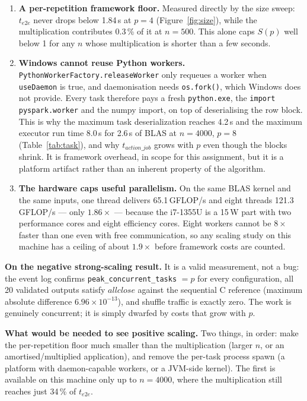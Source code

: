 \documentclass[11pt,a4paper]{article}
\begin{document}
\begin{enumerate}
  \item \textbf{A per-repetition framework floor.} Measured directly by
        the size sweep: $t_{e2e}$ never drops below 1.84\,s at $p=4$
        (Figure~\ref{fig:size}), while the multiplication contributes
        0.3\,\% of it at $n=500$. This alone caps $S(p)$ well below 1
        for any $n$ whose multiplication is shorter than a few seconds.
  \item \textbf{Windows cannot reuse Python workers.}
        \texttt{PythonWorkerFactory.releaseWorker} only requeues a
        worker when \texttt{useDaemon} is true, and daemonisation needs
        \texttt{os.fork()}, which Windows does not provide. Every task
        therefore pays a fresh \texttt{python.exe}, the
        \texttt{import pyspark.worker} and the numpy import, on top of
        deserialising the row block. This is why the maximum task
        deserialization reaches 4.2\,s and the maximum executor run
        time 8.0\,s for 2.6\,s of BLAS at $n=4000$, $p=8$
        (Table~\ref{tab:task}), and why $t_{action\_job}$ grows with $p$
        even though the blocks shrink. It is framework overhead, in
        scope for this assignment, but it is a platform artifact rather
        than an inherent property of the algorithm.
  \item \textbf{The hardware caps useful parallelism.}
        On the same BLAS kernel and the same inputs, one thread delivers
        65.1\,GFLOP/s and eight threads 121.3\,GFLOP/s --- only
        $1.86\times$ --- because the i7-1355U is a 15\,W part with two
        performance cores and eight efficiency cores. Eight workers
        cannot be $8\times$ faster than one even with free
        communication, so any scaling study on this machine has a
        ceiling of about $1.9\times$ before framework costs are counted.
\end{enumerate}

\textbf{On the negative strong-scaling result.}
It is a valid measurement, not a bug: the event log confirms
\texttt{peak\_concurrent\_tasks} $= p$ for every configuration, all 20
validated outputs satisfy $\textit{allclose}$ against the sequential C
reference (maximum absolute difference $6.96\times10^{-13}$), and
shuffle traffic is exactly zero. The work is genuinely concurrent; it is
simply dwarfed by costs that grow with $p$.

\textbf{What would be needed to see positive scaling.}
Two things, in order: make the per-repetition floor much smaller than
the multiplication (larger $n$, or an amortised/multiplied application),
and remove the per-task process spawn (a platform with daemon-capable
workers, or a JVM-side kernel). The first is available on this machine
only up to $n=4000$, where the multiplication still reaches just 34\,\%
of $t_{e2e}$.
\end{document}
